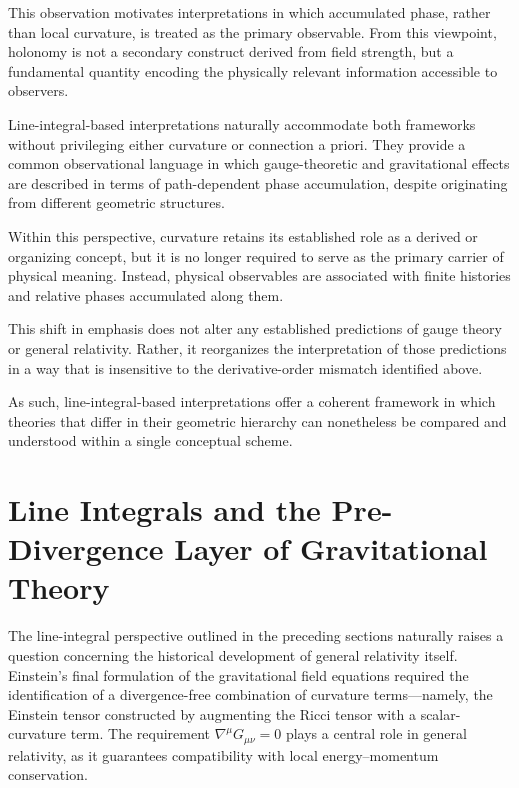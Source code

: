 \documentclass[12pt,letterpaper]{article}
\begin{document}
This observation motivates interpretations in which accumulated phase, rather than local curvature, is treated as the primary observable. From this viewpoint, holonomy is not a secondary construct derived from field strength, but a fundamental quantity encoding the physically relevant information accessible to observers.

Line-integral-based interpretations naturally accommodate both frameworks without privileging either curvature or connection a priori. They provide a common observational language in which gauge-theoretic and gravitational effects are described in terms of path-dependent phase accumulation, despite originating from different geometric structures.

Within this perspective, curvature retains its established role as a derived or organizing concept, but it is no longer required to serve as the primary carrier of physical meaning. Instead, physical observables are associated with finite histories and relative phases accumulated along them.

This shift in emphasis does not alter any established predictions of gauge theory or general relativity.  
Rather, it reorganizes the interpretation of those predictions in a way that is insensitive to the derivative-order mismatch identified above.

As such, line-integral-based interpretations offer a coherent framework in which theories that differ in their geometric hierarchy can nonetheless be compared and understood within a single conceptual scheme.

\section{Line Integrals and the Pre-Divergence Layer of Gravitational Theory}

\justifying
The line-integral perspective outlined in the preceding sections naturally raises a question concerning the historical development of general relativity itself. Einstein's final formulation of the gravitational field equations required the identification of a divergence-free combination of curvature terms—namely, the Einstein tensor constructed by augmenting the Ricci tensor with a scalar-curvature term. The requirement $\nabla^\mu G_{\mu\nu} = 0$ plays a central role in general relativity, as it guarantees compatibility with local energy--momentum conservation.
\end{document}

